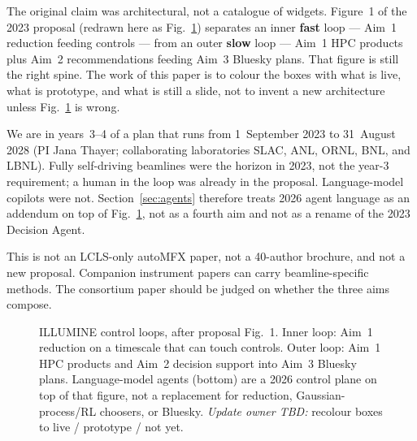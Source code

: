 \documentclass{iucrjournals}
\begin{document}
The original claim was architectural, not a catalogue of widgets. Figure~1 of
the 2023 proposal (redrawn here as Fig.~\ref{fig:loops}) separates an inner
\textbf{fast} loop --- Aim~1 reduction feeding controls --- from an outer
\textbf{slow} loop --- Aim~1 HPC products plus Aim~2 recommendations feeding
Aim~3 Bluesky plans. That figure is still the right spine. The work of this
paper is to colour the boxes with what is live, what is prototype, and what is
still a slide, not to invent a new architecture unless Fig.~\ref{fig:loops} is
wrong.

We are in years~3--4 of a plan that runs from 1~September 2023 to 31~August
2028 (PI Jana Thayer; collaborating laboratories SLAC, ANL, ORNL, BNL, and
LBNL). Fully self-driving beamlines were the horizon in 2023, not the year-3
requirement; a human in the loop was already in the proposal. Language-model
copilots were not. Section~\ref{sec:agents} therefore treats 2026 agent
language as an addendum on top of Fig.~\ref{fig:loops}, not as a fourth aim
and not as a rename of the 2023 Decision Agent.

This is not an LCLS-only autoMFX paper, not a 40-author brochure, and not a
new proposal. Companion instrument papers can carry beamline-specific methods.
The consortium paper should be judged on whether the three aims compose.

\begin{figure}[t]
\centering
{}
\caption{ILLUMINE control loops, after proposal Fig.~1. Inner loop: Aim~1
reduction on a timescale that can touch controls. Outer loop: Aim~1 HPC
products and Aim~2 decision support into Aim~3 Bluesky plans. Language-model
agents (bottom) are a 2026 control plane on top of that figure, not a
replacement for reduction, Gaussian-process/RL choosers, or Bluesky.
\textit{Update owner TBD:} recolour boxes to live / prototype / not yet.}
\label{fig:loops}
\end{figure}
\end{document}
